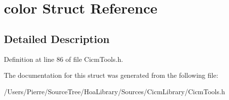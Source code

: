\hypertarget{structcolor}{\section{color Struct Reference}
\label{structcolor}
}


\subsection{Detailed Description}


Definition at line 86 of file Cicm\-Tools.\-h.



The documentation for this struct was generated from the following file\-:\begin{DoxyCompactItemize}
\item 
/\-Users/\-Pierre/\-Source\-Tree/\-Hoa\-Library/\-Sources/\-Cicm\-Library/Cicm\-Tools.\-h\end{DoxyCompactItemize}

